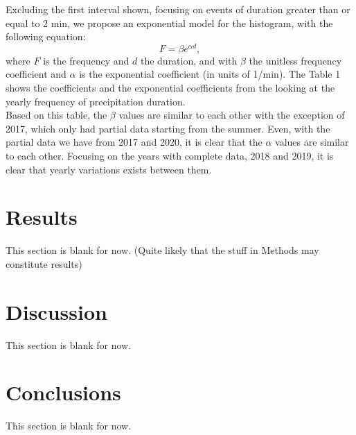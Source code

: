 \documentclass[11pt]{report}
\begin{document}
	
Excluding the first interval shown, focusing on events of duration
greater than or equal to 2 min, we propose an exponential model for
the histogram, with the following equation:
\begin{equation}
	F = \beta e^{\alpha d},
\end{equation}
where $F$ is the frequency and $d$ the duration, and with $\beta$ the
unitless frequency coefficient and $\alpha$ is the exponential
coefficient (in units of 1/min).
The Table 1 shows
the coefficients and the exponential coefficients from the looking at
the yearly frequency of precipitation duration. 
\\ Based on this table, the $\beta$ values are similar to each other with
the exception of 2017, which only had partial data starting from the
summer. Even, with the partial data we have from 2017 and 2020, it is
clear that the $\alpha$ values are similar to each other. Focusing on
the years with complete data, 2018 and 2019, it is clear that yearly
variations exists between them.  


\section{Results \label{sec:results}}
This section is blank for now. (Quite likely that the stuff in Methods may constitute results)

\section{Discussion \label{sec:discussion}}
This section is blank for now. 

\section{Conclusions \label{sec:conclusions}}
This section is blank for now. 

\small
\renewcommand{\bibsep}{0em}

\renewcommand{\bibname}{References}


\end{document}
